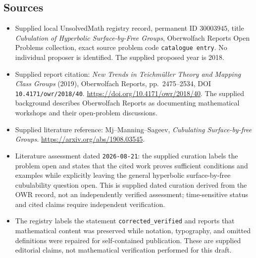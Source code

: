 \documentclass[11pt]{article}
\begin{document}
\subsection{Sources}
\begin{itemize}
\item Supplied local UnsolvedMath registry record, permanent ID \(30003945\), title \emph{Cubulation of Hyperbolic Surface-by-Free Groups}, Oberwolfach Reports Open Problems collection, exact source problem code \texttt{catalogue entry}. No individual proposer is identified. The supplied proposed year is 2018.
\item Supplied report citation: \emph{New Trends in Teichmüller Theory and Mapping Class Groups} (2019), Oberwolfach Reports, pp.\ 2475--2534, DOI \texttt{10.4171/owr/2018/40}. \url{https://doi.org/10.4171/owr/2018/40}. The supplied background describes Oberwolfach Reports as documenting mathematical workshops and their open-problem discussions.
\item Supplied literature reference: Mj--Manning--Sageev, \emph{Cubulating Surface-by-free Groups}. \url{https://arxiv.org/abs/1908.03545}.
\item Literature assessment dated \texttt{2026-08-21}: the supplied curation labels the problem open and states that the cited work proves sufficient conditions and examples while explicitly leaving the general hyperbolic surface-by-free cubulability question open. This is supplied dated curation derived from the OWR record, not an independently verified assessment; time-sensitive status and cited claims require independent verification.
\item The registry labels the statement \texttt{corrected\_verified} and reports that mathematical content was preserved while notation, typography, and omitted definitions were repaired for self-contained publication. These are supplied editorial claims, not mathematical verification performed for this draft.
\end{itemize}
\end{document}
